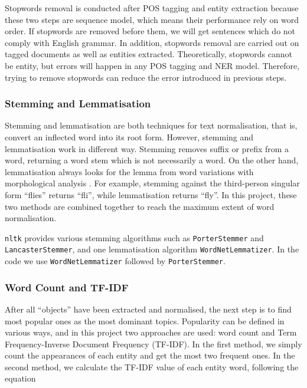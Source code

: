 \documentclass[conference]{IEEEtran}
\begin{document}
Stopwords removal is conducted after POS tagging and entity extraction
because these two steps are sequence model, which means their
performance rely on word order. If stopwords are removed before them, we
will get sentences which do not comply with English grammar. In
addition, stopwords removal are carried out on tagged documents as well
as entities extracted. Theoretically, stopwords cannot be entity, but
errors will happen in any POS tagging and NER model. Therefore, trying
to remove stopwords can reduce the error introduced in previous steps.

\hypertarget{stemming-and-lemmatisation}{%
\subsubsection{Stemming and
Lemmatisation}\label{stemming-and-lemmatisation}}

Stemming and lemmatisation are both techniques for text normalisation,
that is, convert an inflected word into its root form. However, stemming
and lemmatisation work in different way. Stemming removes suffix or
prefix from a word, returning a word stem which is not necessarily a
word. On the other hand, lemmatisation always looks for the lemma from
word variations with morphological analysis
\autocite{jabeen_stemming_2018}. For example, stemming against the
third-person singular form ``flies'' returns ``fli'', while
lemmatisation returns ``fly''. In this project, these two methods are
combined together to reach the maximum extent of word normalisation.

\texttt{nltk} provides various stemming algorithms such as
\texttt{PorterStemmer} and \texttt{LancasterStemmer}, and one
lemmatisation algorithm \texttt{WordNetLemmatizer}. In the code we use
\texttt{WordNetLemmatizer} followed by \texttt{PorterStemmer}.

\hypertarget{word-count-and-tf-idf}{%
\subsubsection{Word Count and TF-IDF}\label{word-count-and-tf-idf}}

After all ``objects'' have been extracted and normalised, the next step
is to find most popular ones as the most dominant topics. Popularity can
be defined in various ways, and in this project two approaches are used:
word count and Term Frequency-Inverse Document Frequency (TF-IDF). In
the first method, we simply count the appearances of each entity and get
the most two frequent ones. In the second method, we calculate the
TF-IDF value of each entity word, following the equation
\autocite{scott_tf-idf_2019}
\end{document}
